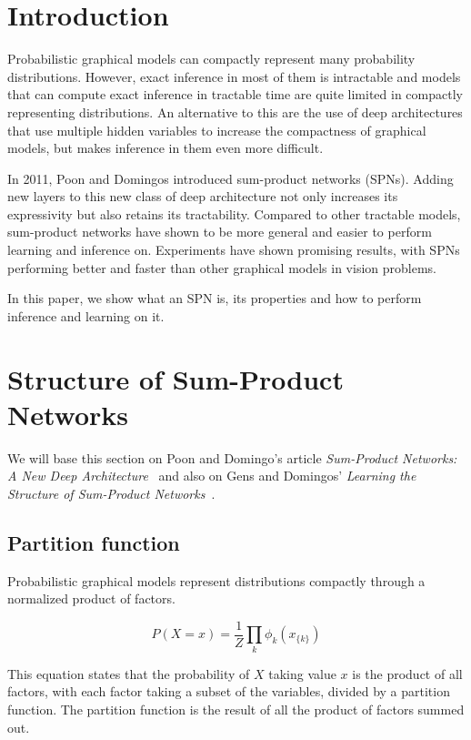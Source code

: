 \documentclass[a4paper,10pt]{article}
\theoremstyle{plain}
\begin{document}
\section{Introduction}

Probabilistic graphical models can compactly represent many probability distributions. However,
exact inference in most of them is intractable and models that can compute exact inference in
tractable time are quite limited in compactly representing distributions. An alternative to this
are the use of deep architectures that use multiple hidden variables to increase the compactness
of graphical models, but makes inference in them even more difficult.

In 2011, Poon and Domingos introduced sum-product networks (SPNs). Adding new layers to this new
class of deep architecture not only increases its expressivity but also retains its tractability.
Compared to other tractable models, sum-product networks have shown to be more general
\cite{poon-domingos} and easier to perform learning and inference on. Experiments have shown
promising results, with SPNs performing better and faster than other graphical models in vision
problems.

In this paper, we show what an SPN is, its properties and how to perform inference and learning on
it.

\section{Structure of Sum-Product Networks}

We will base this section on Poon and Domingo's article \textit{Sum-Product Networks: A New Deep
Architecture}~\cite{poon-domingos} and also on Gens and Domingos' \textit{Learning the Structure of
Sum-Product Networks}~\cite{gens-domingos}.

\subsection{Partition function}

Probabilistic graphical models represent distributions compactly through a normalized product of
factors.

\begin{equation*}
  P(X=x) = \frac{1}{Z}\prod_k \phi_k (x_{\{k\}})
\end{equation*}

This equation states that the probability of $X$ taking value $x$ is the product of all factors,
with each factor taking a subset of the variables, divided by a partition function. The partition
function is the result of all the product of factors summed out.
\end{document}
